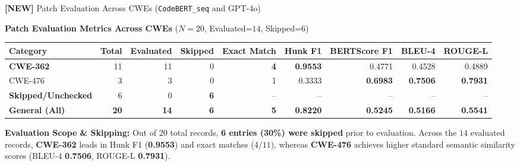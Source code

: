\documentclass[aspectratio=169,10pt]{beamer}
\begin{document}
\begin{frame}{\textbf{[NEW]} Patch Evaluation Across CWEs (\texttt{CodeBERT\_seq} and GPT-4o)}

  \begin{center}
    {\small\textbf{Patch Evaluation Metrics Across CWEs} {\scriptsize($N=20$, Evaluated=$14$, Skipped=$6$)}}\\[4pt]
    {\scriptsize
    \renewcommand{\arraystretch}{1.15}
    \setlength{\tabcolsep}{4pt}
    \begin{tabular}{lrrrrrrrr}
      \toprule
      \textbf{Category} & \textbf{Total} & \textbf{Evaluated} & \textbf{Skipped} & \textbf{Exact Match} & \textbf{Hunk F1} & \textbf{BERTScore F1} & \textbf{BLEU-4} & \textbf{ROUGE-L} \\
      \midrule
      \rowcolor{hit!12}
      \textbf{CWE-362} & 11 & 11 & 0 & \textbf{4} & \textbf{0.9553} & 0.4771 & 0.4528 & 0.4889 \\
      CWE-476          & 3  & 3  & 0 & 1          & 0.3333          & \textbf{0.6983} & \textbf{0.7506} & \textbf{0.7931} \\
      \rowcolor{miss!15}
      \textbf{Skipped/Unchecked} & 6 & 0 & \textcolor{miss}{\textbf{6}} & -- & -- & -- & -- & -- \\
      \midrule
      \textbf{General (All)} & \textbf{20} & \textbf{14} & \textcolor{miss}{\textbf{6}} & \textbf{5} & \textbf{0.8220} & \textbf{0.5245} & \textbf{0.5166} & \textbf{0.5541} \\
      \bottomrule
    \end{tabular}}
  \end{center}

  \vspace{0.35em}
  \begin{tcolorbox}[colback=miss!5, colframe=miss!70!black, boxrule=0.35pt,
    left=3pt, right=3pt, top=2pt, bottom=1pt, arc=2pt, width=\linewidth]
    \scriptsize
    \textbf{Evaluation Scope \& Skipping:} Out of $20$ total records, \textcolor{miss}{\textbf{6 entries (30\%) were skipped}} prior to evaluation. Across the $14$ evaluated records, \textbf{CWE-362} leads in Hunk F1 (\textbf{0.9553}) and exact matches ($4/11$), whereas \textbf{CWE-476} achieves higher standard semantic similarity scores (BLEU-4 \textbf{0.7506}, ROUGE-L \textbf{0.7931}).
  \end{tcolorbox}

  \vspace{0.2em}

\end{frame}
\end{document}
